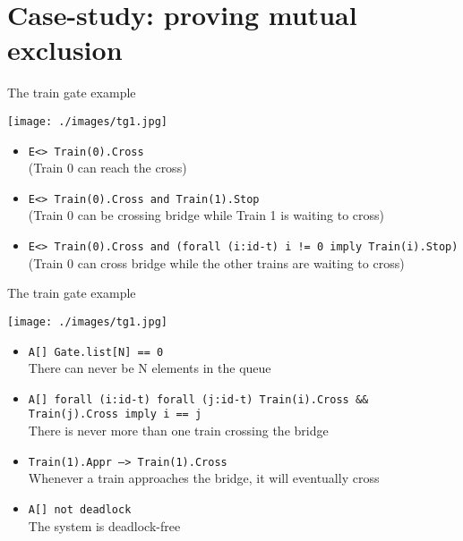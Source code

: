 \documentclass{beamer}
\def\dkb#1{{\blue #1}}
\begin{document}



\section{Case-study: proving mutual exclusion}



\begin{slide}{The train gate example}
\small

\begin{center}
\texttt{[image: ./images/tg1.jpg]} 
\end{center}

\begin{itemize}
\item \texttt{E<> Train(0).Cross} 
\\ \dkb{(Train 0 can reach the cross)}
\item \texttt{E<> Train(0).Cross and Train(1).Stop}
\\ \dkb{(Train 0 can be crossing bridge while Train 1 is waiting to cross)}
\item \texttt{E<> Train(0).Cross and (forall (i:id-t) i != 0 imply Train(i).Stop)}
\\ \dkb{(Train 0 can cross bridge while the other trains are waiting to cross)}
\end{itemize}

\end{slide}

\begin{slide}{The train gate example}
\small

\begin{center}
\texttt{[image: ./images/tg1.jpg]} 
\end{center}


\begin{itemize}
\item \texttt{A[] Gate.list[N] == 0}
\\ \dkb{There can never be N elements in the queue}
\item \texttt{A[] forall (i:id-t) forall (j:id-t) Train(i).Cross \&\& Train(j).Cross imply i == j}
\\ \dkb{There is never more than one train crossing the bridge}
\item \texttt{Train(1).Appr --> Train(1).Cross}
\\ \dkb{Whenever a train approaches the bridge, it will eventually cross}
\item \texttt{A[] not deadlock}
\\ \dkb{The system is deadlock-free}
\end{itemize}


\end{slide}
\end{document}
